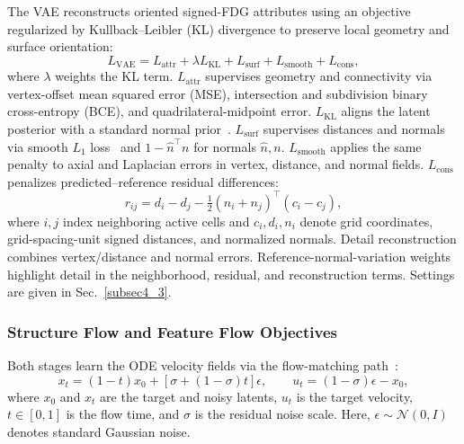 \documentclass[preprint,review,12pt]{elsarticle}
\begin{document}
\hspace{2em}The VAE reconstructs oriented signed-FDG attributes using an objective regularized by Kullback--Leibler (KL) divergence to preserve local geometry and surface orientation:
\begin{equation}
L_{\mathrm{VAE}} = L_{\mathrm{attr}} + \lambda L_{\mathrm{KL}}
+ L_{\mathrm{surf}} + L_{\mathrm{smooth}} + L_{\mathrm{cons}},
\label{eq:vae_training_objective}
\end{equation}
where \(\lambda\) weights the KL term. \(L_{\mathrm{attr}}\) supervises geometry and connectivity via vertex-offset mean squared error (MSE), intersection and subdivision binary cross-entropy (BCE), and quadrilateral-midpoint error. \(L_{\mathrm{KL}}\) aligns the latent posterior with a standard normal prior~\cite{Kingma2013AutoEncoding}. \(L_{\mathrm{surf}}\) supervises distances and normals via smooth \(L_1\) loss~\cite{Girshick2015FastRCNN} and \(1-\hat{n}^{\top}n\) for normals \(\hat{n},n\). \(L_{\mathrm{smooth}}\) applies the same penalty to axial and Laplacian errors in vertex, distance, and normal fields. \(L_{\mathrm{cons}}\) penalizes predicted--reference residual differences:
\begin{equation}
r_{ij}=d_i-d_j-\tfrac12(n_i+n_j)^{\top}(c_i-c_j),
\label{eq:distance_normal_residual}
\end{equation}
where \(i,j\) index neighboring active cells and \(c_i,d_i,n_i\) denote grid coordinates, grid-spacing-unit signed distances, and normalized normals. Detail reconstruction combines vertex/distance and normal errors. Reference-normal-variation weights highlight detail in the neighborhood, residual, and reconstruction terms. Settings are given in Sec.~\ref{subsec4_3}.

\subsubsection{Structure Flow and Feature Flow Objectives}\label{subsec3_5_2}

\hspace{2em}Both stages learn the ODE velocity fields via the flow-matching path~\cite{lipman2023flow}:
\begin{equation}
x_t=(1-t)x_0+[\sigma+(1-\sigma)t]\epsilon,
\qquad u_t=(1-\sigma)\epsilon-x_0,
\label{eq:flow_training_path}
\end{equation}
where $x_0$ and $x_t$ are the target and noisy latents, $u_t$ is the target velocity, $t\in[0,1]$ is the flow time, and $\sigma$ is the residual noise scale. Here, \(\epsilon\sim\mathcal N(0,I)\) denotes standard Gaussian noise.
\end{document}
